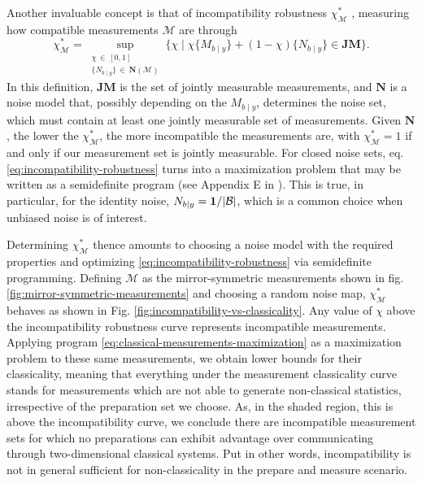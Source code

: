 \documentclass[a4paper,preprintnumbers,floatfix,superscriptaddress,pra,twocolumn,showpacs,notitlepage,longbibliography]{revtex4-2}
\begin{document}
        Another invaluable concept is that of incompatibility robustness $\chi^*_\mathcal{M}$ \cite{designolle-incompatibility-2019}, measuring how compatible measurements $\mathcal{M}$ are through
        \begin{equation}
            \chi^*_\mathcal{M} = \sup_{\substack{\chi \,\in\, [0, 1]\\ \{N_{b \mid y}\} \,\in\, \textbf{N}( \mathcal{M} )}} \{ \chi \mid \chi \{ M_{b \mid y} \} + (1 - \chi) \{ N_{b \mid y} \} \in \textbf{JM} \} .
            \label{eq:incompatibility-robustness}
        \end{equation}
        In this definition, $\textbf{JM}$ is the set of jointly measurable measurements, and $\textbf{N}$ is a noise model that, possibly depending on the $M_{b \mid y}$, determines the noise set, which must contain at least one jointly measurable set of measurements. Given $\textbf{N}$, the lower the $\chi^*_\mathcal{M}$, the more incompatible the measurements are, with $\chi^*_\mathcal{M} = 1$ if and only if our measurement set is jointly measurable. For closed noise sets, eq. \eqref{eq:incompatibility-robustness} turns into a maximization problem that may be written as a semidefinite program (see Appendix E in \cite{designolle-incompatibility-2019}). This is true, in particular, for the identity noise, $N_{b|y} = \bm{1}/\abs{\mathcal{B}}$, which is a common choice when unbiased noise is of interest.
        
        Determining $\chi^*_\mathcal{M}$ thence amounts to choosing a noise model with the required properties and optimizing \eqref{eq:incompatibility-robustness} via semidefinite programming. Defining $\mathcal{M}$ as the mirror-symmetric measurements shown in fig. \ref{fig:mirror-symmetric-measurements} and choosing a random noise map, $\chi^*_\mathcal{M}$ behaves as shown in Fig. \ref{fig:incompatibility-vs-classicality}. Any value of $\chi$ above the incompatibility robustness curve represents incompatible measurements. Applying program \eqref{eq:classical-measurements-maximization} as a maximization problem to these same measurements, we obtain lower bounds for their classicality, meaning that everything under the measurement classicality curve stands for measurements which are not able to generate non-classical statistics, irrespective of the preparation set we choose. As, in the shaded region, this is above the incompatibility curve, we conclude there are incompatible measurement sets for which no preparations can exhibit advantage over communicating through two-dimensional classical systems. Put in other words, incompatibility is not in general sufficient for non-classicality in the prepare and measure scenario.
        
\end{document}
